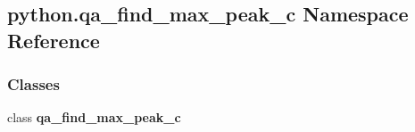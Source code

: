 \subsection{python.\+qa\+\_\+find\+\_\+max\+\_\+peak\+\_\+c Namespace Reference}
\label{namespacepython_1_1qa__find__max__peak__c}
\subsubsection*{Classes}
\begin{DoxyCompactItemize}
\item 
class {\bf qa\+\_\+find\+\_\+max\+\_\+peak\+\_\+c}
\end{DoxyCompactItemize}
